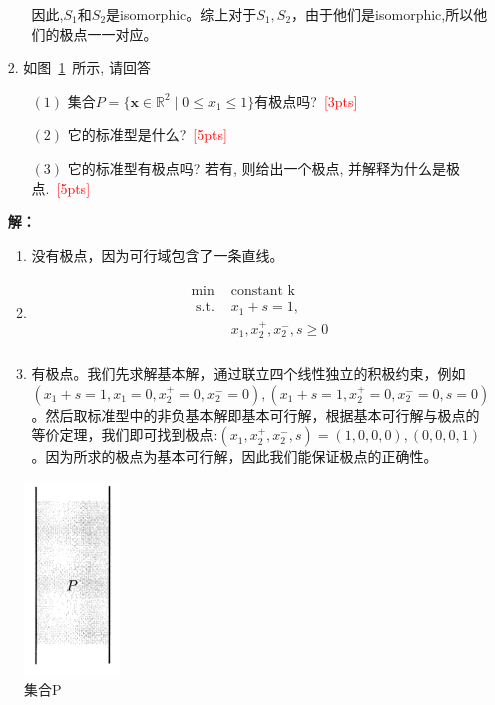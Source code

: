 \documentclass[10pt]{article}
\begin{document}
\begin{itemize}
\begin{itemize}
	因此,$S_1$和$S_2$是isomorphic。综上对于$S_1,S_2$，由于他们是isomorphic,所以他们的极点一一对应。
	\end{itemize}
	\item[$2.$]
	如图~\ref{fig: linear program}~所示, 请回答
	\begin{itemize}
		\item[$(1)$] 集合$P = \{\bm{x}\in\mathbb{R}^{2}\mid 0\leq x_1\leq 1\}$有极点吗?~\textcolor{red}{[3pts]}
		
		\item[$(2)$] 它的标准型是什么?~\textcolor{red}{[5pts]}
		
		\item[$(3)$] 它的标准型有极点吗? 若有, 则给出一个极点, 并解释为什么是极点.~\textcolor{red}{[5pts]}
	\end{itemize}
	\textbf{解：}
	\begin{enumerate}
	\item 没有极点，因为可行域包含了一条直线。
	\item 
	\begin{equation*}\label{eq: ex3}
	\begin{array}{c}
		\begin{aligned}
			\min~& \text{constant k} \\
			\textrm { s.t. } & x_1 + s =1, \\
			&x_1,x_2^+,x_2^-,s\ge0 \\
		\end{aligned}
	\end{array}
	\end{equation*}
	\item 有极点。我们先求解基本解，通过联立四个线性独立的积极约束，例如$(x_1+s=1,x_1=0,x_2^+=0,x_2^-=0),(x_1+s=1,x_2^+=0,x_2^-=0,s=0)$。然后取标准型中的非负基本解即基本可行解，根据基本可行解与极点的等价定理，我们即可找到极点:$(x_1,x_2^+,x_2^-,s)=(1,0,0,0),(0,0,0,1)$。因为所求的极点为基本可行解，因此我们能保证极点的正确性。

	\end{enumerate}
\end{itemize}
\begin{figure}[htbp]
	\centering
	\includegraphics[width=1in]{lp.jpg}
	\caption{集合P}
	\label{fig: linear program}
\end{figure}
\end{document}
